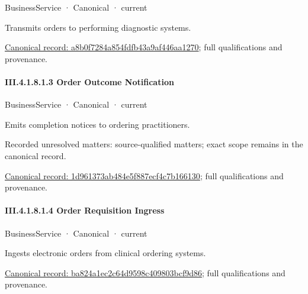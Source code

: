 \label{element:a8b0f7284a854fdfb43a9af446aa1270}
{\small BusinessService · Canonical · current}\par

Transmits orders to performing diagnostic systems.


{\footnotesize \href{../../../../../../../continuum/business/business-service/a8b0f7284a854fdfb43a9af446aa1270.md}{Canonical record: a8b0f7284a854fdfb43a9af446aa1270}; full qualifications and provenance.}\par
\paragraph*{III.4.1.8.1.3 Order Outcome Notification}
\label{navigation:III.4.1.8.1.3}

\label{element:1d961373ab484e5f887ecf4c7b166130}
{\small BusinessService · Canonical · current}\par

Emits completion notices to ordering practitioners.


{\small Recorded unresolved matters: source-qualified matters; exact scope remains in the canonical record.}\par
{\footnotesize \href{../../../../../../../continuum/business/business-service/1d961373ab484e5f887ecf4c7b166130.md}{Canonical record: 1d961373ab484e5f887ecf4c7b166130}; full qualifications and provenance.}\par
\paragraph*{III.4.1.8.1.4 Order Requisition Ingress}
\label{navigation:III.4.1.8.1.4}

\label{element:ba824a1ec2c64d9598c409803bcf9d86}
{\small BusinessService · Canonical · current}\par

Ingests electronic orders from clinical ordering systems.


{\footnotesize \href{../../../../../../../continuum/business/business-service/ba824a1ec2c64d9598c409803bcf9d86.md}{Canonical record: ba824a1ec2c64d9598c409803bcf9d86}; full qualifications and provenance.}\par
